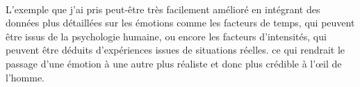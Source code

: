 ~\par
L’exemple que j’ai pris peut-être très facilement amélioré en intégrant des données plus détaillées sur les émotions comme les  facteurs de temps, qui peuvent être issus de la psychologie humaine, ou encore les facteurs d'intensités, qui peuvent être déduits d'expériences issues de situations réelles. ce qui rendrait le passage d’une émotion à une autre plus réaliste et donc plus crédible à l’œil de l’homme.
